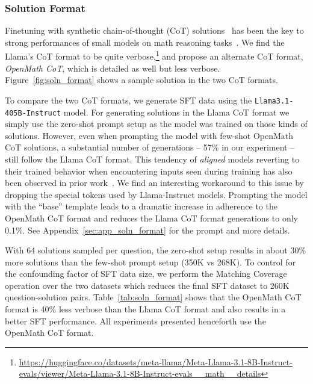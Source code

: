 \subsubsection{Solution Format}


Finetuning with synthetic chain-of-thought (CoT) solutions~\citep{nye2021workscratchpadsintermediatecomputation, wei2022chain, sprague2024cotcotchainofthoughthelps} has been the key to strong performances of small models on math reasoning tasks~\citep{yu2024metamath, toshniwal2024openmathinstruct, dubey2024llama3herdmodels}. 
We find the Llama's CoT format to be quite verbose,\footnote{\url{https://huggingface.co/datasets/meta-llama/Meta-Llama-3.1-8B-Instruct-evals/viewer/Meta-Llama-3.1-8B-Instruct-evals__math__details}} and propose an alternate CoT format, \emph{OpenMath CoT}, which is detailed as well but less verbose. 
Figure~\ref{fig:soln_format} shows a sample solution in the two CoT formats. 




To compare the two CoT formats, we generate SFT data using the \texttt{Llama3.1-405B-Instruct} model. 
For generating solutions in the Llama CoT format we simply use the zero-shot prompt setup as the model was trained on those kinds of solutions. 
However, even when prompting the model with few-shot OpenMath CoT solutions, a substantial number of generations -- 57\% in our experiment -- still follow the Llama CoT format. 
This tendency of \emph{aligned} models reverting to their trained behavior when encountering inputs seen during training has also been observed in prior work~\citep{min-etal-2022-rethinking}. 
We find an interesting workaround to this issue by dropping the special tokens used by Llama-Instruct models. 
Prompting the model with the ``base'' template leads to a dramatic increase in adherence to the OpenMath CoT format and reduces the Llama CoT format generations to only 0.1\%. See Appendix~\ref{sec:app_soln_format} for the prompt and more details. 







With 64 solutions sampled per question, the zero-shot setup results in about 30\% more solutions than the few-shot prompt setup (350K vs 268K). 
To control for the confounding factor of SFT data size, we perform the Matching Coverage operation over the two datasets which reduces the final SFT dataset to 260K question-solution pairs. 
Table~\ref{tab:soln_format} shows that the OpenMath CoT format is 40\% less verbose than the Llama CoT format and also results in a better SFT performance. 
All experiments presented henceforth use the OpenMath CoT format. 

    
    
    
    







